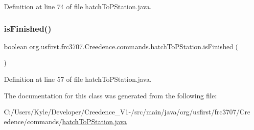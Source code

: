 Definition at line 74 of file hatch\+To\+P\+Station.\+java.

\mbox{\label{classorg_1_1usfirst_1_1frc3707_1_1_creedence_1_1commands_1_1hatch_to_p_station_a8b92b45e3a9729e2893bd4cc26319a97}} 
\subsubsection{\texorpdfstring{isFinished()}{isFinished()}}
{\footnotesize\ttfamily boolean org.\+usfirst.\+frc3707.\+Creedence.\+commands.\+hatch\+To\+P\+Station.\+is\+Finished (\begin{DoxyParamCaption}{ }\end{DoxyParamCaption})\hspace{0.3cm}{\ttfamily [protected]}}



Definition at line 57 of file hatch\+To\+P\+Station.\+java.



The documentation for this class was generated from the following file\+:\begin{DoxyCompactItemize}
\item 
C\+:/\+Users/\+Kyle/\+Developer/\+Creedence\+\_\+\+V1-\//src/main/java/org/usfirst/frc3707/\+Creedence/commands/\mbox{\hyperlink{hatch_to_p_station_8java}{hatch\+To\+P\+Station.\+java}}\end{DoxyCompactItemize}
